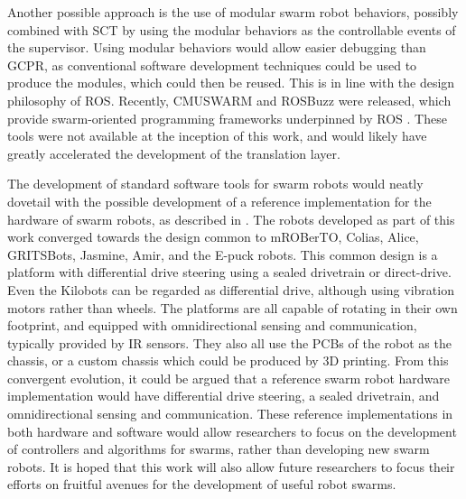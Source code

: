 Another possible approach is the use of modular swarm robot behaviors, possibly combined with SCT by using the modular behaviors as the controllable events of the supervisor. 
Using modular behaviors would allow easier debugging than GCPR, as conventional software development techniques could be used to produce the modules, which could then be reused. 
This is in line with the design philosophy of ROS. 
Recently, CMUSWARM and ROSBuzz were released, which provide swarm-oriented programming frameworks underpinned by ROS \citep{arpino2018using, DBLP:journals/corr/abs-1710-08843}.
These tools were not available at the inception of this work, and would likely have greatly accelerated the development of the translation layer. 

The development of standard software tools for swarm robots would neatly dovetail with the possible development of a reference implementation for the hardware of swarm robots, as described in \citep{francesca2014experiment}.
The robots developed as part of this work converged towards the design common to mROBerTO, Colias, Alice, GRITSBots, Jasmine, Amir, and the E-puck robots. 
This common design is a platform with differential drive steering using a sealed drivetrain or direct-drive. 
Even the Kilobots can be regarded as differential drive, although using vibration motors rather than wheels.
The platforms are all capable of rotating in their own footprint, and equipped with omnidirectional sensing and communication, typically provided by IR sensors.
They also all use the PCBs of the robot as the chassis, or a custom chassis which could be produced by 3D printing.  
From this convergent evolution, it could be argued that a reference swarm robot hardware implementation would have differential drive steering, a sealed drivetrain, and omnidirectional sensing and communication.
These reference implementations in both hardware and software would allow researchers to focus on the development of controllers and algorithms for swarms, rather than developing new swarm robots.
It is hoped that this work will also allow future researchers to focus their efforts on fruitful avenues for the development of useful robot swarms.   

%
%	

